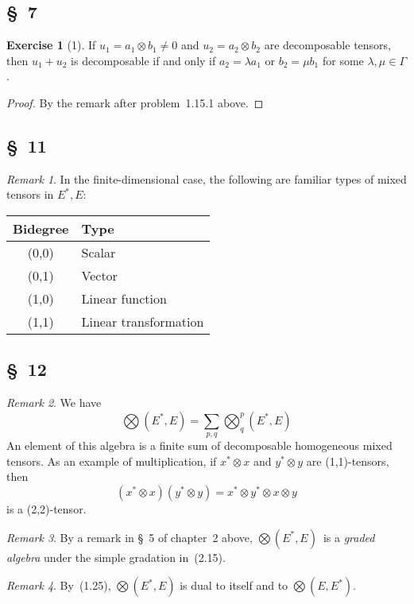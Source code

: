 \documentclass[letterpaper,12pt]{article}
\newcommand{\tprod}{\otimes}
\newcommand{\bigtprod}{\bigotimes}
\newcommand{\medtprod}{{\textstyle\bigtprod}}
\theoremstyle{definition}
\newtheorem*{exer}{Exercise}
\theoremstyle{remark}
\newtheorem*{rmk}{Remark}
\begin{document}
\subsection*{\S~7}
\begin{exer}[1]
If \(u_1=a_1\tprod b_1\ne 0\) and \(u_2=a_2\tprod b_2\) are decomposable tensors, then \(u_1+u_2\) is decomposable if and only if \(a_2=\lambda a_1\) or \(b_2=\mu b_1\) for some \(\lambda,\mu\in\Gamma\).
\end{exer}
\begin{proof}
By the remark after problem~1.15.1 above.
\end{proof}

\subsection*{\S~11}
\begin{rmk}
In the finite-dimensional case, the following are familiar types of mixed tensors in \(E^*,E\):
\begin{center}
\begin{tabular}{|c|l|}
\hline
\textbf{Bidegree}&\textbf{Type}\\
\hline
(0,0)&Scalar\\
(0,1)&Vector\\
(1,0)&Linear function\\
(1,1)&Linear transformation\\
\hline
\end{tabular}
\end{center}
\end{rmk}

\subsection*{\S~12}
\begin{rmk}
We have
\[\medtprod(E^*,E)=\sum_{p,q}\medtprod^p_q(E^*,E)\]
An element of this algebra is a finite sum of decomposable homogeneous mixed tensors. As an example of multiplication, if \(x^*\tprod x\) and \(y^*\tprod y\) are (1,1)-tensors, then
\[(x^*\tprod x)(y^*\tprod y)=x^*\tprod y^*\tprod x\tprod y\]
is a (2,2)-tensor.
\end{rmk}

\begin{rmk}
By a remark in \S~5 of chapter~2 above, \(\medtprod(E^*,E)\)~is a \emph{graded algebra} under the simple gradation in~(2.15).
\end{rmk}

\begin{rmk}
By~(1.25), \(\medtprod(E^*,E)\) is dual to itself and to \(\medtprod(E,E^*)\).
\end{rmk}
\end{document}
